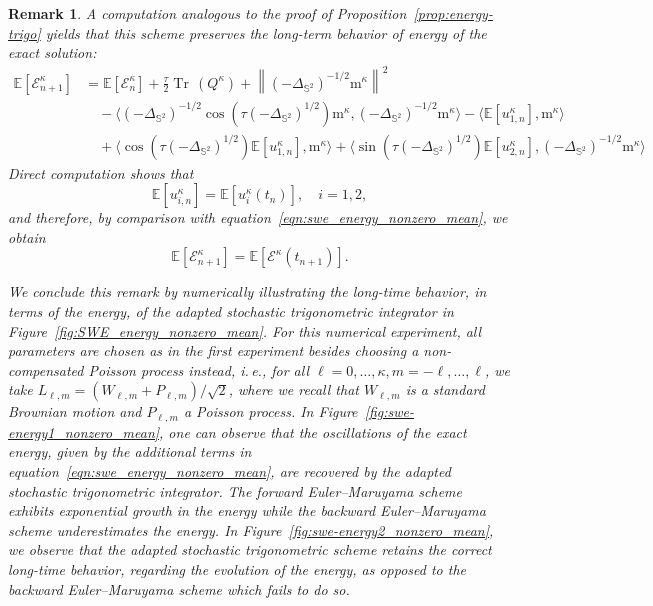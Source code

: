 \documentclass[11pt]{amsart}
\newtheorem{remark}[theorem]{Remark}
\newcommand{\E}{{\mathbb E}}
\newcommand{\IS}{\mathbb{S}}
\newcommand{\tr}{{\operatorname{Tr}\, }}
\newcommand{\cE}{\mathcal E}
\providecommand{\norm}[1]{\left\lVert#1\right\rVert}
\newcommand{\mean}{\mathrm{m}}
\newcommand{\Deltalb}{\Delta_{\IS^2}}
\begin{document}
\begin{remark}
A computation analogous to the proof of Proposition~\ref{prop:energy-trigo} yields that this scheme preserves the long-term behavior
of energy of the exact solution:
\begin{align*}
    \E\left[\cE^\kappa_{n+1}\right] &= \E\left[\cE^\kappa_n\right] + \frac{\tau}{2}\tr(Q^\kappa) + \norm{(-\Deltalb)^{-1/2}\mean^\kappa}^2 \\
    & \quad - \langle(-\Deltalb)^{-1/2} \cos(\tau(-\Deltalb)^{1/2}) \mean^\kappa, (-\Deltalb)^{-1/2} \mean^\kappa\rangle - \langle \E\left[{u_{1,n}^\kappa}\right], \mean^\kappa \rangle\\
    & \quad
    + \langle \cos(\tau(-\Deltalb)^{1/2})\E\left[{u_{1,n}^\kappa}\right], \mean^\kappa \rangle + \langle \sin(\tau(-\Deltalb)^{1/2})\E\left[{u_{2,n}^\kappa}\right], {(-\Deltalb)^{-1/2}}\mean^\kappa\rangle
\end{align*}
Direct computation shows that
\begin{equation*}
    \E\left[u^\kappa_{i, n}\right]  = \E\left[u^\kappa_i(t_{n})\right], \quad i = 1, 2,
\end{equation*}
and therefore, by comparison with equation~\eqref{eqn:swe_energy_nonzero_mean}, we obtain
\begin{equation*}
    \E\left[\cE^\kappa_{n+1}\right]  = \E\left[\cE^\kappa(t_{n+1})\right].
\end{equation*}

We conclude this remark by numerically illustrating the long-time behavior, in terms of the energy, of the adapted stochastic trigonometric integrator in Figure~\ref{fig:SWE_energy_nonzero_mean}. For this numerical experiment, all parameters are chosen as in the first experiment
besides choosing a non-compensated Poisson process instead, i.\,e., for all $\ell = 0, \dots, \kappa, m=-\ell, \dots, \ell$, we take
$L_{\ell , m} = \left(W_{\ell, m} + P_{\ell, m}\right)/\sqrt{2}$, where we recall that $W_{\ell, m}$ is a standard Brownian motion
and $P_{\ell, m}$ a Poisson process. In Figure~\ref{fig:swe-energy1_nonzero_mean}, one can observe that the oscillations of the exact energy, given by the additional terms in equation~\eqref{eqn:swe_energy_nonzero_mean}, are recovered by the adapted stochastic trigonometric integrator.
The forward Euler--Maruyama scheme exhibits exponential growth in the energy while the backward Euler--Maruyama scheme underestimates the energy.
In Figure~\ref{fig:swe-energy2_nonzero_mean}, we observe that the adapted stochastic trigonometric scheme retains the correct long-time behavior, regarding the evolution of the energy, as opposed to the backward Euler--Maruyama scheme which fails to do so.


\end{remark}
\end{document}
